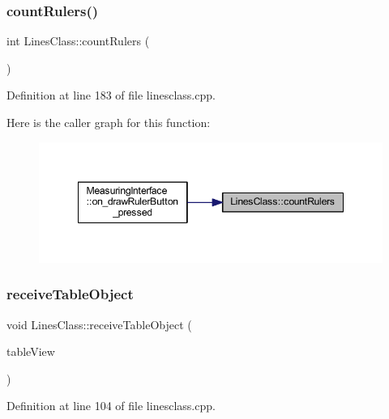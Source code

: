 \subsubsection{\texorpdfstring{countRulers()}{countRulers()}}
{\footnotesize\ttfamily int Lines\+Class\+::count\+Rulers (\begin{DoxyParamCaption}{ }\end{DoxyParamCaption})}



Definition at line 183 of file linesclass.\+cpp.

Here is the caller graph for this function\+:
\nopagebreak
\begin{figure}[H]
\begin{center}
\leavevmode
\includegraphics[width=348pt]{class_lines_class_a1b656266d53d9364c9969514efd2c878_icgraph}
\end{center}
\end{figure}
\mbox{\label{class_lines_class_a7cbdbb9847cc00cbc64141572c536866}} 
\subsubsection{\texorpdfstring{receiveTableObject}{receiveTableObject}}
{\footnotesize\ttfamily void Lines\+Class\+::receive\+Table\+Object (\begin{DoxyParamCaption}\item[{Q\+Table\+View \&}]{table\+View }\end{DoxyParamCaption})\hspace{0.3cm}{\ttfamily [slot]}}



Definition at line 104 of file linesclass.\+cpp.

